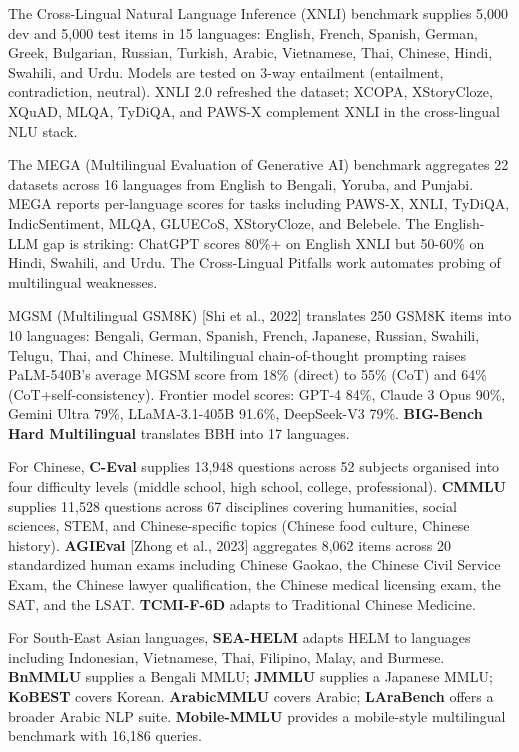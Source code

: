 \documentclass{article}
\begin{document}
The Cross-Lingual Natural Language Inference (XNLI) benchmark \cite{conneau20182018} supplies 5,000 dev and 5,000 test items in 15 languages: English, French, Spanish, German, Greek, Bulgarian, Russian, Turkish, Arabic, Vietnamese, Thai, Chinese, Hindi, Swahili, and Urdu. Models are tested on 3-way entailment (entailment, contradiction, neutral). XNLI 2.0 \cite{upadhyay2023xnli20improvingxnl} refreshed the dataset; XCOPA, XStoryCloze, XQuAD, MLQA, TyDiQA, and PAWS-X complement XNLI in the cross-lingual NLU stack.

The MEGA (Multilingual Evaluation of Generative AI) benchmark \cite{ahuja20232023} aggregates 22 datasets across 16 languages from English to Bengali, Yoruba, and Punjabi. MEGA reports per-language scores for tasks including PAWS-X, XNLI, TyDiQA, IndicSentiment, MLQA, GLUECoS, XStoryCloze, and Belebele. The English-LLM gap is striking: ChatGPT scores 80\%+ on English XNLI but 50-60\% on Hindi, Swahili, and Urdu. The Cross-Lingual Pitfalls work \cite{xu20252025} automates probing of multilingual weaknesses.

MGSM (Multilingual GSM8K) {[}Shi et al., 2022{]} translates 250 GSM8K items into 10 languages: Bengali, German, Spanish, French, Japanese, Russian, Swahili, Telugu, Thai, and Chinese. Multilingual chain-of-thought prompting raises PaLM-540B's average MGSM score from 18\% (direct) to 55\% (CoT) and 64\% (CoT+self-consistency). Frontier model scores: GPT-4 84\%, Claude 3 Opus 90\%, Gemini Ultra 79\%, LLaMA-3.1-405B 91.6\%, DeepSeek-V3 79\%. \textbf{BIG-Bench Hard Multilingual} translates BBH into 17 languages.

For Chinese, \textbf{C-Eval} \cite{huang20232023} supplies 13,948 questions across 52 subjects organised into four difficulty levels (middle school, high school, college, professional). \textbf{CMMLU} \cite{li20242024} supplies 11,528 questions across 67 disciplines covering humanities, social sciences, STEM, and Chinese-specific topics (Chinese food culture, Chinese history). \textbf{AGIEval} {[}Zhong et al., 2023{]} aggregates 8,062 items across 20 standardized human exams including Chinese Gaokao, the Chinese Civil Service Exam, the Chinese lawyer qualification, the Chinese medical licensing exam, the SAT, and the LSAT. \textbf{TCMI-F-6D} \cite{teng20262026} adapts to Traditional Chinese Medicine.

For South-East Asian languages, \textbf{SEA-HELM} \cite{susanto20252025} adapts HELM to languages including Indonesian, Vietnamese, Thai, Filipino, Malay, and Burmese. \textbf{BnMMLU} \cite{joy2025bnmmlumeasuringmas} supplies a Bengali MMLU; \textbf{JMMLU} supplies a Japanese MMLU; \textbf{KoBEST} covers Korean. \textbf{ArabicMMLU} covers Arabic; \textbf{LAraBench} \cite{abdelali20232023} offers a broader Arabic NLP suite. \textbf{Mobile-MMLU} \cite{bsharat20252025} provides a mobile-style multilingual benchmark with 16,186 queries.
\end{document}
